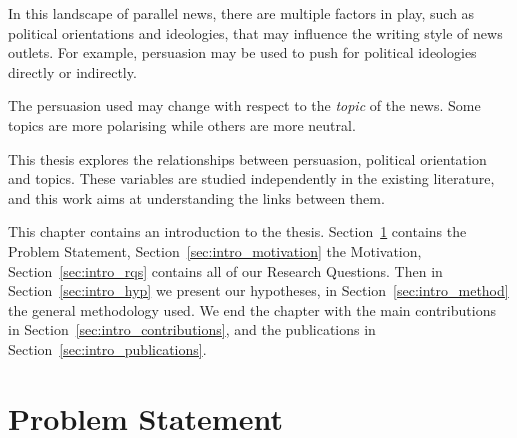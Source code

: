 In this landscape of parallel news, there are multiple factors in play, such as political orientations and ideologies, that may influence the writing style of news outlets.
For example, persuasion may be used to push for political ideologies directly or indirectly.

The persuasion used may change with respect to the \emph{topic} of the news. Some topics are more polarising while others are more neutral.




This thesis explores the relationships between persuasion, political orientation and topics.
These variables are studied independently in the existing literature, and this work aims at understanding the links between them.









This chapter contains an introduction to the thesis.
Section~\ref{sec:intro_problem} contains the Problem Statement, Section~\ref{sec:intro_motivation} the Motivation, Section~\ref{sec:intro_rqs} contains all of our Research Questions. Then in Section~\ref{sec:intro_hyp} we present our hypotheses, in Section~\ref{sec:intro_method} the general methodology used. We end the chapter with the main contributions in Section~\ref{sec:intro_contributions}, %
and the publications in Section~\ref{sec:intro_publications}.


\section{\statusgreen Problem Statement}
\label{sec:intro_problem}


